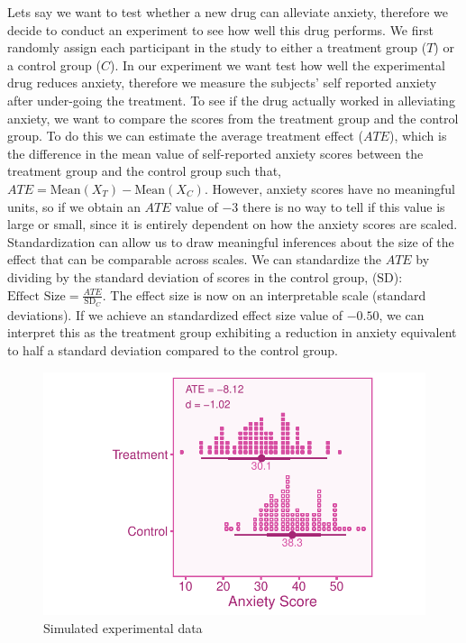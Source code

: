 \documentclass[
  letterpaper,
  DIV=11,
  numbers=noendperiod]{scrreprt}
\begin{document}
Lets say we want to test whether a new drug can alleviate anxiety,
therefore we decide to conduct an experiment to see how well this drug
performs. We first randomly assign each participant in the study to
either a treatment group (\(T\)) or a control group (\(C\)). In our
experiment we want test how well the experimental drug reduces anxiety,
therefore we measure the subjects' self reported anxiety after
under-going the treatment. To see if the drug actually worked in
alleviating anxiety, we want to compare the scores from the treatment
group and the control group. To do this we can estimate the average
treatment effect (\(ATE\)), which is the difference in the mean value of
self-reported anxiety scores between the treatment group and the control
group such that, \(ATE = \text{Mean}(X_T) - \text{Mean}(X_C)\). However,
anxiety scores have no meaningful units, so if we obtain an \(ATE\)
value of \(-3\) there is no way to tell if this value is large or small,
since it is entirely dependent on how the anxiety scores are scaled.
Standardization can allow us to draw meaningful inferences about the
size of the effect that can be comparable across scales. We can
standardize the \(ATE\) by dividing by the standard deviation of scores
in the control group, (\(\text{SD}\)):
\(\text{Effect Size} = \frac{ATE}{\text{SD}_C}\). The effect size is now
on an interpretable scale (standard deviations). If we achieve an
standardized effect size value of \(-0.50\), we can interpret this as
the treatment group exhibiting a reduction in anxiety equivalent to half
a standard deviation compared to the control group.

\begin{figure}

{\centering \includegraphics{intro_files/figure-pdf/unnamed-chunk-1-1.pdf}

}

\caption{Simulated experimental data}

\end{figure}
\end{document}
